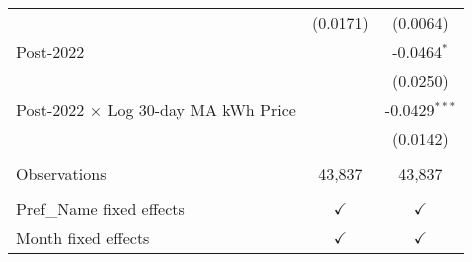 \begin{table}[htbp]
\begin{tabular}{lcc}
                                                & (0.0171)        & (0.0064)\\   
      Post-2022                                 &                 & -0.0464$^{*}$\\   
                                                &                 & (0.0250)\\   
      Post-2022 × Log 30-day MA kWh Price       &                 & -0.0429$^{***}$\\   
                                                &                 & (0.0142)\\   
       \\
      Observations                              & 43,837          & 43,837\\  
       \\
      Pref\_Name fixed effects                  & $\checkmark$    & $\checkmark$\\   
      Month fixed effects                       & $\checkmark$    & $\checkmark$\\   
      \bottomrule
   \end{tabular}
\end{table}


